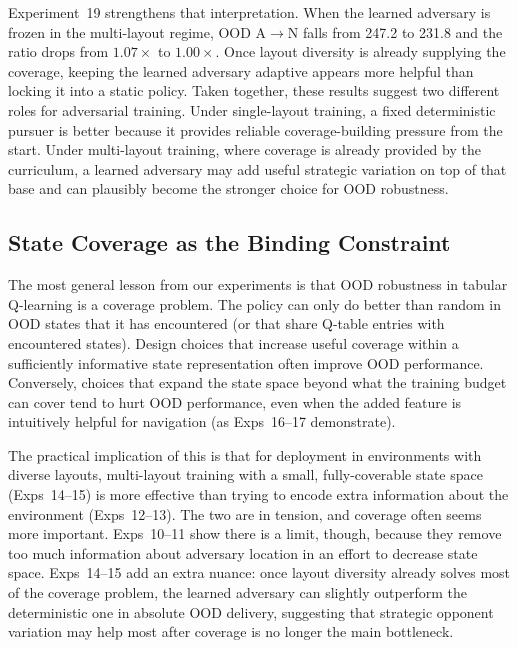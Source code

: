 \documentclass[sigconf]{aamas}
\begin{document}
Experiment~19 strengthens that interpretation. When the learned adversary is
frozen in the multi-layout regime, OOD A$\to$N falls from 247.2 to 231.8 and
the ratio drops from $1.07\times$ to $1.00\times$. Once layout diversity is
already supplying the coverage, keeping the learned adversary adaptive appears
more helpful than locking it into a static policy. Taken together, these results
suggest two different roles for adversarial training. Under single-layout
training, a fixed deterministic pursuer is better because it provides reliable
coverage-building pressure from the start. Under multi-layout training, where
coverage is already provided by the curriculum, a learned adversary may add
useful strategic variation on top of that base and can plausibly become the
stronger choice for OOD robustness.

\subsection{State Coverage as the Binding Constraint}

The most general lesson from our experiments is that OOD robustness in tabular
Q-learning is a coverage problem. The policy can only do better than random in OOD
states that it has encountered (or that share Q-table entries with encountered states).
Design choices that increase useful coverage within a sufficiently informative
state representation often improve OOD performance. Conversely, choices that
expand the state space beyond what the training budget can cover tend to hurt OOD
performance, even when the added feature is intuitively helpful for navigation
(as Exps~16--17 demonstrate).

The practical implication of this is that for deployment in environments with diverse
layouts, multi-layout training with a small, fully-coverable state space (Exps~14--15)
is more effective than trying to encode extra information about the environment
(Exps~12--13). The two are in tension, and coverage often seems more important. Exps~10--11 show there is a limit, though, because they remove too much information about adversary location in an effort to decrease state space. Exps~14--15 add an extra nuance: once layout diversity already solves most of the coverage problem, the learned adversary can slightly outperform the deterministic one in absolute OOD delivery, suggesting that strategic opponent variation may help most after coverage is no longer the main bottleneck.
\end{document}
